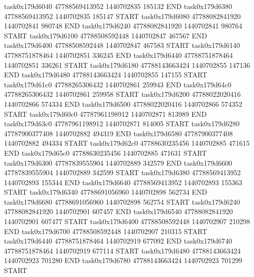 task0x179d6040 47788569413952          1440702835               185132  END
task0x179d6380 47788569413952          1440702835               185147  START
task0x179d6080 47788082841920          1440702841               980748  END
task0x179d6240 47788082841920          1440702841               980764  START
task0x179d6100 47788508592448          1440702847               467567  END
task0x179d6400 47788508592448          1440702847               467583  START
task0x179d6140 47788751878464          1440702851               336245  END
task0x179d6440 47788751878464          1440702851               336261  START
task0x179d6180 47788143663424          1440702855               147136  END
task0x179d6480 47788143663424          1440702855               147155  START
task0x179d61c0 47788265306432          1440702861               259943  END
task0x179d64c0 47788265306432          1440702861               259958  START
task0x179d6200 47788022020416          1440702866               574334  END
task0x179d6500 47788022020416          1440702866               574352  START
task0x179d60c0 47787961198912          1440702871               813989  END
task0x179d63c0 47787961198912          1440702871               814005  START
task0x179d6280 47787900377408          1440702882               494319  END
task0x179d6580 47787900377408          1440702882               494334  START
task0x179d62c0 47788630235456          1440702885               471615  END
task0x179d65c0 47788630235456          1440702885               471631  START
task0x179d6300 47787839555904          1440702889               342579  END
task0x179d6600 47787839555904          1440702889               342599  START
task0x179d6380 47788569413952          1440702893               155344  END
task0x179d6640 47788569413952          1440702893               155363  START
task0x179d6340 47788691056960          1440702898               562734  END
task0x179d6680 47788691056960          1440702898               562754  START
task0x179d6240 47788082841920          1440702901               607457  END
task0x179d6540 47788082841920          1440702901               607477  START
task0x179d6400 47788508592448          1440702907               210298  END
task0x179d6700 47788508592448          1440702907               210315  START
task0x179d6440 47788751878464          1440702919               677092  END
task0x179d6740 47788751878464          1440702919               677114  START
task0x179d6480 47788143663424          1440702923               701280  END
task0x179d6780 47788143663424          1440702923               701299  START

